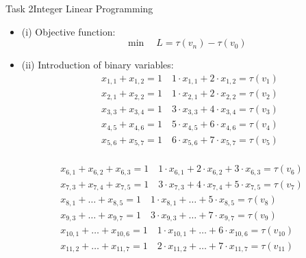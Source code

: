 \begin{frame}[allowframebreaks]{Task 2}{Integer Linear Programming}
  \begin{solutionnoinc}
    \begin{itemize}
      \item \alert{(i) Objective function:}
      \[
      \min \quad L=\tau\left(v_n\right)-\tau\left(v_0\right)
      \]
      \item \alert{(ii) Introduction of binary variables:}
      \[
        \begin{aligned}
        & x_{1,1}+x_{1,2}=1 \quad 1 \cdot x_{1,1}+2 \cdot x_{1,2}=\tau\left(v_1\right) \\
        & x_{2,1}+x_{2,2}=1 \quad 1 \cdot x_{2,1}+2 \cdot x_{2,2}=\tau\left(v_2\right) \\
        & x_{3,3}+x_{3,4}=1 \quad 3 \cdot x_{3,3}+4 \cdot x_{3,4}=\tau\left(v_3\right) \\
        & x_{4,5}+x_{4,6}=1 \quad 5 \cdot x_{4,5}+6 \cdot x_{4,6}=\tau\left(v_4\right) \\
        & x_{5,6}+x_{5,7}=1 \quad 6 \cdot x_{5,6}+7 \cdot x_{5,7}=\tau\left(v_5\right) \\
        \end{aligned}
      \]
    \end{itemize}
  \end{solutionnoinc}
  \framebreak
  \begin{solutionnoinc}
      \[
      \begin{aligned}
        & x_{6,1}+x_{6,2}+x_{6,3}=1 \quad 1 \cdot x_{6,1}+2 \cdot x_{6,2}+3 \cdot x_{6,3}=\tau\left(v_6\right) \\
        & x_{7,3}+x_{7,4}+x_{7,5}=1 \quad 3 \cdot x_{7,3}+4 \cdot x_{7,4}+5 \cdot x_{7,5}=\tau\left(v_7\right) \\
        & x_{8,1}+\ldots+x_{8,5}=1 \quad 1 \cdot x_{8,1}+\ldots+5 \cdot x_{8,5}=\tau\left(v_8\right) \\
        & x_{9,3}+\ldots+x_{9,7}=1 \quad 3 \cdot x_{9,3}+\ldots+7 \cdot x_{9,7}=\tau\left(v_9\right) \\
        & x_{10,1}+\ldots+x_{10,6}=1 \quad 1 \cdot x_{10,1}+\ldots+6 \cdot x_{10,6}=\tau\left(v_{10}\right) \\
        & x_{11,2}+\ldots+x_{11,7}=1 \quad 2 \cdot x_{11,2}+\ldots+7 \cdot x_{11,7}=\tau\left(v_{11}\right) \\
      \end{aligned}
      \]
  \end{solutionnoinc}
  \begin{solutionnoinc}

\end{solutionnoinc}
\end{frame}

